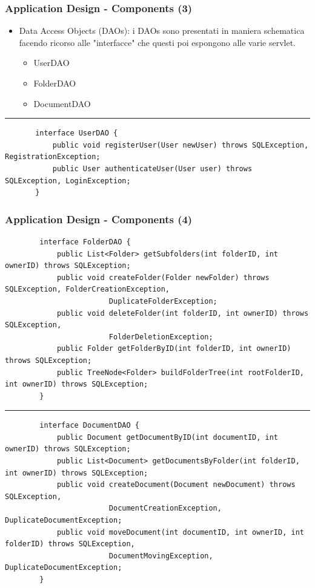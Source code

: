 \documentclass[aspectratio=169, dvipsnames]{beamer}
\begin{document}
\begin{frame}[fragile]
    \frametitle{Application Design - Components (3)}
    \begin{itemize}
        \item Data Access Objects (DAOs): i DAOs sono presentati in maniera schematica facendo ricorso alle
              "interfacce" che questi poi espongono alle varie servlet.
              \begin{itemize}
                  \item UserDAO
                  \item FolderDAO
                  \item DocumentDAO
              \end{itemize}
    \end{itemize}

    \scriptsize
    \rule{\textwidth}{0.25pt}
    \begin{verbatim}
       interface UserDAO {
           public void registerUser(User newUser) throws SQLException, RegistrationException;
           public User authenticateUser(User user) throws SQLException, LoginException;
       }
    \end{verbatim}
\end{frame}

\begin{frame}[fragile]
    \frametitle{Application Design - Components (4)}
    \scriptsize
    \begin{verbatim}
        interface FolderDAO {
            public List<Folder> getSubfolders(int folderID, int ownerID) throws SQLException;
            public void createFolder(Folder newFolder) throws SQLException, FolderCreationException,
                        DuplicateFolderException;
            public void deleteFolder(int folderID, int ownerID) throws SQLException,
                        FolderDeletionException;
            public Folder getFolderByID(int folderID, int ownerID) throws SQLException;
            public TreeNode<Folder> buildFolderTree(int rootFolderID, int ownerID) throws SQLException;
        }
    \end{verbatim}
    \rule{\textwidth}{0.25pt}
    \scriptsize
    \begin{verbatim}
        interface DocumentDAO {
            public Document getDocumentByID(int documentID, int ownerID) throws SQLException;
            public List<Document> getDocumentsByFolder(int folderID, int ownerID) throws SQLException;
            public void createDocument(Document newDocument) throws SQLException,
                        DocumentCreationException, DuplicateDocumentException;
            public void moveDocument(int documentID, int ownerID, int folderID) throws SQLException,
                        DocumentMovingException, DuplicateDocumentException;
        }
    \end{verbatim}
\end{frame}
\end{document}
